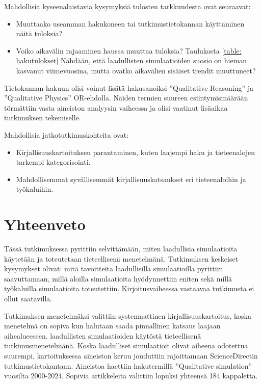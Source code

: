 \documentclass[utf8]{gradu3}
\begin{document}
Mahdollisia kyseenalaistavia kysymyksiä tulosten tarkkuudesta ovat seuraavat:
\begin{itemize}
    \item Muuttaako useamman hakukoneen tai tutkimustietokannan käyttäminen näitä tuloksia? 
    \item Voiko aikavälin rajaaminen haussa muuttaa tuloksia? Taulukosta \ref{table: hakutulokset} Nähdään, että laadullisten simulaatioiden suosio on hieman kasvanut
    viimevuosina, mutta ovatko aikavälien sisäiset trendit muuttuneet?
\end{itemize}

Tietokannan hakuun olisi voinut lisätä hakusanoiksi 
''Qualitative Reasoning'' ja ''Qualitative Physics'' OR-ehdolla. 
Näiden termien suureen esiintymismäärään törmättiin vasta aineiston 
analyysin vaiheessa ja olisi vaatinut lisäaikaa tutkimuksen tekemiselle.

Mahdollisia jatkotutkimuskohteita ovat: 
\begin{itemize}
    \item Kirjallisuuskartoituksen parantaminen, kuten laajempi haku ja tieteenalojen tarkempi kategorisointi.
    \item Mahdollisemmat syvällisemmät kirjallisuuskatsaukset eri tieteenaloihin ja työkaluihin.
\end{itemize}

\chapter{Yhteenveto}
Tässä tutkimuksessa pyrittiin selvittämään, miten laadullisia simulaatioita 
käytetään ja toteutetaan tieteellisenä menetelmänä. 
Tutkimuksen keskeiset kysymykset olivat: 
mitä tavoitteita laadullisilla simulaatioilla pyrittiin saavuttamaan, 
millä aloilla simulaatioita hyödynnettiin eniten 
sekä millä työkaluilla simulaatioita toteutettiin. 
Kirjoitusvaiheessa vastaavaa tutkimusta ei ollut saatavilla.

Tutkimuksen menetelmäksi valittiin systemaattinen kirjallisuuskartoitus, koska
menetelmä on sopiva kun halutaan saada pinnallinen katsaus laajaan aihealueeseen.
laadullisten simulaatioiden käytöstä tieteellisenä tutkimusmenetelmänä.
Koska laadulliset simulaatioit olivat aiheena odotettua suurempi, 
kartoituksessa aineiston keruu jouduttiin rajoittamaan ScienceDirectin 
tutkimustietokantaan. Aineistoa haettiin hakutermillä ''Qualitative simulation''
vuosilta 2000-2024. Sopivia artikkeleita valittiin lopuksi yhteensä 184 kappaletta.
\end{document}
